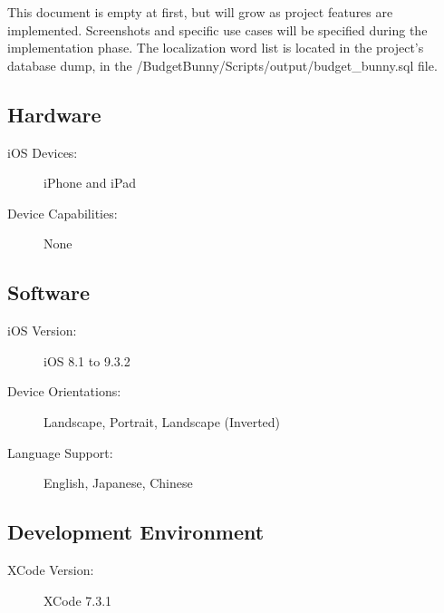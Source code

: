 
This document is empty at first, but will grow as project features are implemented.  
Screenshots and specific use cases will be specified during the implementation phase.
The localization word list is located in the project's database dump, in the /BudgetBunny/Scripts/output/budget\_bunny.sql file.

\subsection{Hardware}
\begin{description}
\item[iOS Devices:] iPhone and iPad
\item[Device Capabilities:] None
\end{description}

\subsection{Software}
\begin{description}
\item[iOS Version:] iOS 8.1 to 9.3.2
\item[Device Orientations:] Landscape, Portrait, Landscape (Inverted)
\item[Language Support:] English, Japanese, Chinese
\end{description}

\subsection{Development Environment}
\begin{description}
\item[XCode Version:] XCode 7.3.1
\end{description}

